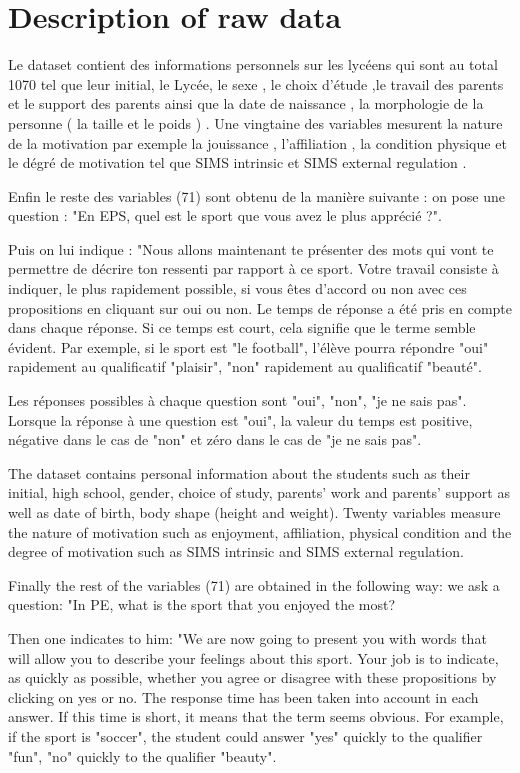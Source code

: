 \documentclass[12pt]{article}
\begin{document}
\section{Description of raw data}

Le dataset contient des informations personnels sur les lycéens qui sont au total 1070 tel  que leur initial, le Lycée, le sexe , le choix d'étude ,le travail des parents et le support des parents ainsi que la date de naissance , la  morphologie de la personne ( la taille et le poids ) . Une vingtaine des  variables mesurent la nature de la motivation par exemple la jouissance , l'affiliation , la condition physique  et  le dégré de motivation tel que SIMS intrinsic et SIMS external regulation . 

Enfin le reste des  variables (71)  sont obtenu de la manière suivante :
on pose une question : "En EPS, quel est le sport que vous avez le plus apprécié ?".

Puis on lui indique :
"Nous allons maintenant te présenter des mots qui vont te permettre de décrire ton ressenti par rapport à ce sport. Votre travail consiste à indiquer, le plus rapidement possible, si vous êtes d'accord ou non avec ces propositions en cliquant sur oui ou non.
Le temps de réponse a été pris en compte dans chaque réponse. Si ce temps est court, cela signifie que le terme semble évident.
Par exemple, si le sport est "le football", l'élève pourra répondre "oui" rapidement au qualificatif "plaisir", "non" rapidement au qualificatif "beauté".

Les réponses possibles à chaque question sont "oui", "non", "je ne sais pas". Lorsque la réponse à une question est "oui", la valeur du temps est positive, négative dans le cas de "non" et zéro dans le cas de "je ne sais pas".



The dataset contains personal information about the students such as their initial, high school, gender, choice of study, parents' work and parents' support as well as date of birth, body shape (height and weight). Twenty variables measure the nature of motivation such as enjoyment, affiliation, physical condition and the degree of motivation such as SIMS intrinsic and SIMS external regulation. 

Finally the rest of the variables (71) are obtained in the following way:
we ask a question: "In PE, what is the sport that you enjoyed the most?

Then one indicates to him:
"We are now going to present you with words that will allow you to describe your feelings about this sport. Your job is to indicate, as quickly as possible, whether you agree or disagree with these propositions by clicking on yes or no.
The response time has been taken into account in each answer. If this time is short, it means that the term seems obvious.
For example, if the sport is "soccer", the student could answer "yes" quickly to the qualifier "fun", "no" quickly to the qualifier "beauty".
\end{document}
